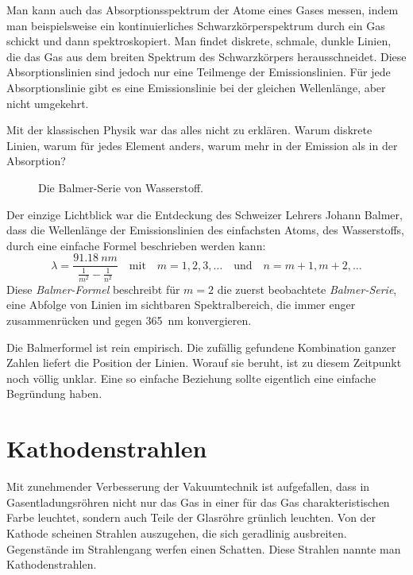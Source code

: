 Man kann auch das Absorptionsspektrum der Atome eines Gases messen, indem man beispielsweise ein kontinuierliches Schwarzkörperspektrum durch ein Gas schickt und dann spektroskopiert. Man findet diskrete, schmale, dunkle Linien, die das Gas aus dem breiten Spektrum des Schwarzkörpers herausschneidet. Diese Absorptionslinien sind jedoch nur eine Teilmenge der Emissionslinien. Für jede Absorptionslinie gibt es eine Emissionslinie bei der gleichen Wellenlänge, aber nicht umgekehrt.

Mit der klassischen Physik war das alles nicht zu erklären. Warum diskrete Linien, warum für jedes Element anders, warum mehr in der Emission als in der Absorption?


\begin{figure}
    \pgfspectra[width=\textwidth, element=H,back=visible40, gamma=.6,axis, axis step=50,axis ticks=4,begin=300,end=750,
    axis label text={Wellenlänge $\lambda$ (nm)},axis label position=right, UVcolor=white, IRcolor=white]
    
    \caption{Die Balmer-Serie von Wasserstoff.}
    \end{figure}

Der einzige Lichtblick war die Entdeckung des Schweizer Lehrers Johann Balmer, dass die Wellenlänge der Emissionslinien des einfachsten Atoms, des Wasserstoffs, durch eine einfache Formel beschrieben werden kann:
\begin{equation}
    \lambda = \frac{\SI{91.18}{nm}}{ 
       \frac{1}{m^2} - \frac{1}{n^2} 
    }
    \quad \text{mit} \quad m = 1,2, 3, \dots \quad \text{und} \quad n = m+1, m+2, \dots
\end{equation}
Diese \emph{Balmer-Formel} beschreibt für $m=2$ die zuerst beobachtete \emph{Balmer-Serie}, eine Abfolge von Linien im sichtbaren Spektralbereich, die immer enger zusammenrücken und gegen 365~nm konvergieren.  

Die Balmerformel ist rein empirisch. Die zufällig gefundene Kombination ganzer Zahlen liefert die Position der Linien. Worauf sie beruht, ist zu diesem Zeitpunkt noch völlig unklar. Eine so einfache Beziehung sollte eigentlich eine einfache Begründung haben.


\section{Kathodenstrahlen}

Mit zunehmender Verbesserung der Vakuumtechnik ist aufgefallen, dass in Gasentladungsröhren nicht nur das Gas in einer für das Gas charakteristischen Farbe leuchtet, sondern auch Teile der Glasröhre grünlich leuchten.  Von der Kathode scheinen Strahlen auszugehen, die sich geradlinig ausbreiten. Gegenstände im Strahlengang werfen einen Schatten. Diese Strahlen nannte man Kathodenstrahlen.


